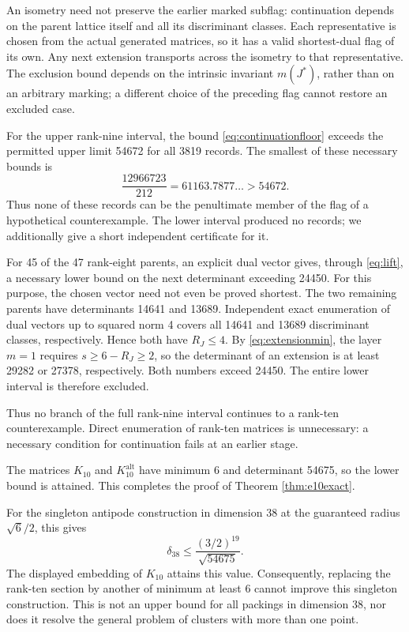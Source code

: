 \documentclass[11pt,a4paper]{article}
\theoremstyle{remark}\newtheorem{remark}[theorem]{Remark}
\newcommand{\Kalt}{K_{10}^{\mathrm{alt}}}
\begin{document}
An isometry need not preserve the earlier marked subflag: continuation depends on the parent lattice itself and all its discriminant classes. Each representative is chosen from the actual generated matrices, so it has a valid shortest-dual flag of its own. Any next extension transports across the isometry to that representative. The exclusion bound depends on the intrinsic invariant $m(J^*)$, rather than on an arbitrary marking; a different choice of the preceding flag cannot restore an excluded case.

For the upper rank-nine interval, the bound \eqref{eq:continuationfloor} exceeds the permitted upper limit 54672 for all 3819 records. The smallest of these necessary bounds is
\[
\frac{12966723}{212}=61163.7877\ldots>54672.
\]
Thus none of these records can be the penultimate member of the flag of a hypothetical counterexample. The lower interval produced no records; we additionally give a short independent certificate for it.

For 45 of the 47 rank-eight parents, an explicit dual vector gives, through \eqref{eq:lift}, a necessary lower bound on the next determinant exceeding 24450. For this purpose, the chosen vector need not even be proved shortest. The two remaining parents have determinants 14641 and 13689. Independent exact enumeration of dual vectors up to squared norm 4 covers all 14641 and 13689 discriminant classes, respectively. Hence both have $R_J\le4$. By \eqref{eq:extensionmin}, the layer $m=1$ requires $s\ge6-R_J\ge2$, so the determinant of an extension is at least 29282 or 27378, respectively. Both numbers exceed 24450. The entire lower interval is therefore excluded.

Thus no branch of the full rank-nine interval continues to a rank-ten counterexample. Direct enumeration of rank-ten matrices is unnecessary: a necessary condition for continuation fails at an earlier stage.

The matrices $K_{10}$ and $\Kalt$ have minimum 6 and determinant 54675, so the lower bound is attained. This completes the proof of Theorem \ref{thm:e10exact}.

For the singleton antipode construction in dimension 38 at the guaranteed radius $\sqrt6/2$, this gives
\[
\delta_{38}\le\frac{(3/2)^{19}}{\sqrt{54675}}.
\]
The displayed embedding of $K_{10}$ attains this value. Consequently, replacing the rank-ten section by another of minimum at least 6 cannot improve this singleton construction. This is not an upper bound for all packings in dimension 38, nor does it resolve the general problem of clusters with more than one point.
\end{document}
